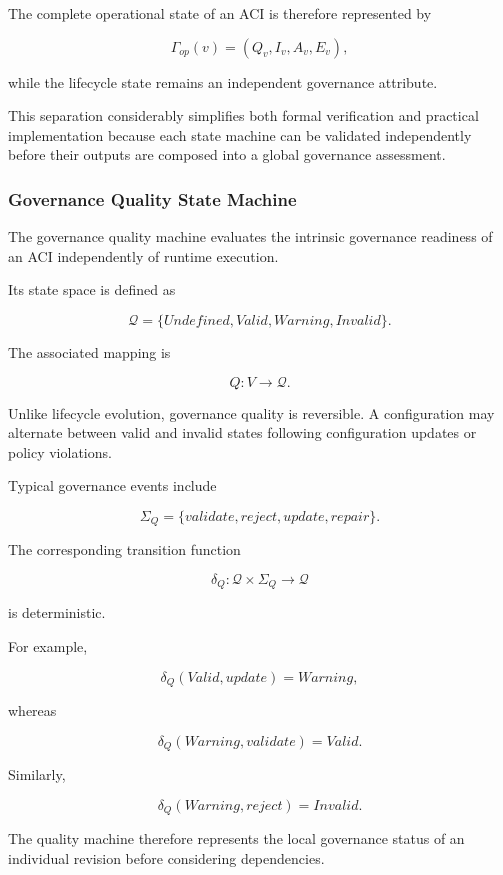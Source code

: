 \documentclass[10pt]{article}
\begin{document}
The complete operational state of an ACI is therefore represented by

\[
\Gamma_{op}(v)
=
(
Q_v,
I_v,
A_v,
E_v
),
\]

while the lifecycle state remains an independent governance attribute.

This separation considerably simplifies both formal verification and practical
implementation because each state machine can be validated independently before
their outputs are composed into a global governance assessment.

\subsubsection{Governance Quality State Machine}

The governance quality machine evaluates the intrinsic governance readiness of
an ACI independently of runtime execution.

Its state space is defined as

\[
\mathcal{Q}
=
\{
Undefined,
Valid,
Warning,
Invalid
\}.
\]

The associated mapping is

\[
Q:V\rightarrow\mathcal{Q}.
\]

Unlike lifecycle evolution, governance quality is reversible.
A configuration may alternate between valid and invalid states following
configuration updates or policy violations.

Typical governance events include

\[
\Sigma_Q
=
\{
validate,
reject,
update,
repair
\}.
\]

The corresponding transition function

\[
\delta_Q
:
\mathcal{Q}
\times
\Sigma_Q
\rightarrow
\mathcal{Q}
\]

is deterministic.

For example,

\[
\delta_Q
(
Valid,
update
)
=
Warning,
\]

whereas

\[
\delta_Q
(
Warning,
validate
)
=
Valid.
\]

Similarly,

\[
\delta_Q
(
Warning,
reject
)
=
Invalid.
\]

The quality machine therefore represents the local governance status of an
individual revision before considering dependencies.
\end{document}
